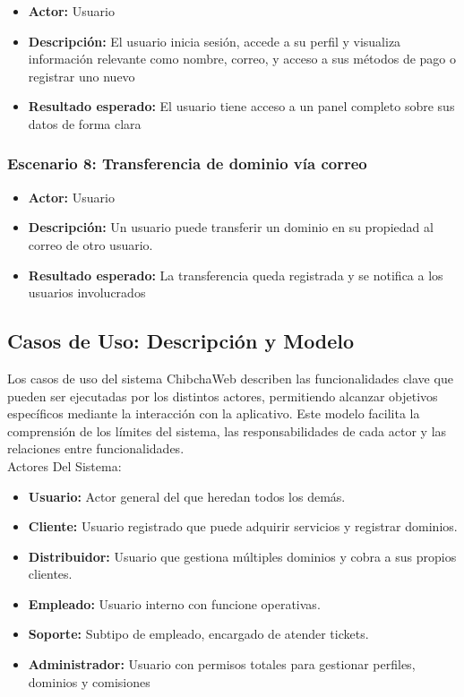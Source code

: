 \begin{itemize}
\item \textbf{Actor:} Usuario
\item \textbf{Descripción:} El usuario inicia sesión, accede a su perfil y visualiza información relevante como nombre, correo, y acceso a sus métodos de pago o registrar uno nuevo
\item \textbf{Resultado esperado:} El usuario tiene acceso a un panel completo sobre sus datos de forma clara
\end{itemize}

\subsubsection{Escenario 8: Transferencia de dominio vía correo}

\begin{itemize}
\item \textbf{Actor:} Usuario
\item \textbf{Descripción:} Un usuario puede transferir un dominio en su propiedad al correo de otro usuario.
\item \textbf{Resultado esperado:} La transferencia queda registrada y se notifica a los usuarios involucrados
\end{itemize}

\subsection{Casos de Uso: Descripción y Modelo}

Los casos de uso del sistema ChibchaWeb describen las funcionalidades clave que pueden ser ejecutadas por los distintos actores, permitiendo alcanzar objetivos específicos mediante la interacción con la aplicativo. Este modelo facilita la comprensión de los límites del sistema, las responsabilidades de cada actor y las relaciones entre funcionalidades.\\

Actores Del Sistema:
\begin{itemize}
    \item \textbf{Usuario:} Actor general del que heredan todos los demás.
    \item \textbf{Cliente:} Usuario registrado que puede adquirir servicios y registrar dominios.
    \item \textbf{Distribuidor:} Usuario que gestiona múltiples dominios y cobra a sus propios clientes.
    \item \textbf{Empleado:} Usuario interno con funcione operativas.
    \item \textbf{Soporte:} Subtipo de empleado, encargado de atender tickets.
    \item \textbf{Administrador:} Usuario con permisos totales para gestionar perfiles, dominios y comisiones
\end{itemize}

